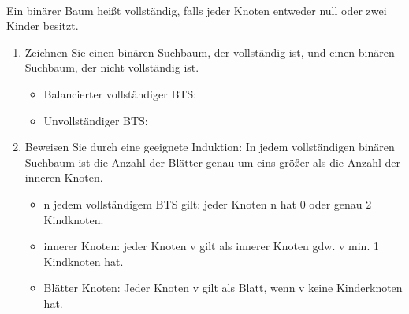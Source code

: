 \begin{problemlist}

 \\
Ein binärer Baum heißt vollständig, falls jeder Knoten entweder null oder zwei Kinder besitzt.
\begin{enumerate}

\item Zeichnen Sie einen binären Suchbaum, der vollständig ist, und einen binären Suchbaum, der nicht vollständig ist.

\begin{answer}
\begin{itemize}
	\item Balancierter vollständiger BTS:
\end{itemize}

\begin{itemize}
	\item Unvollständiger BTS:
\end{itemize}


\end{answer}

\item Beweisen Sie durch eine geeignete Induktion: In jedem vollständigen binären Suchbaum ist die Anzahl der Blätter genau um eins größer als die Anzahl der inneren Knoten.

\begin{answer}
\begin{itemize}
	\item n jedem vollständigem BTS gilt: jeder Knoten n hat 0 oder genau 2 Kindknoten. 
    \item innerer Knoten: jeder Knoten v gilt als innerer Knoten gdw. v min. 1 Kindknoten hat.
    \item Blätter Knoten: Jeder Knoten v gilt als Blatt, wenn v keine Kinderknoten hat.
\end{itemize}


\end{answer}
\end{enumerate}
\end{problemlist}
